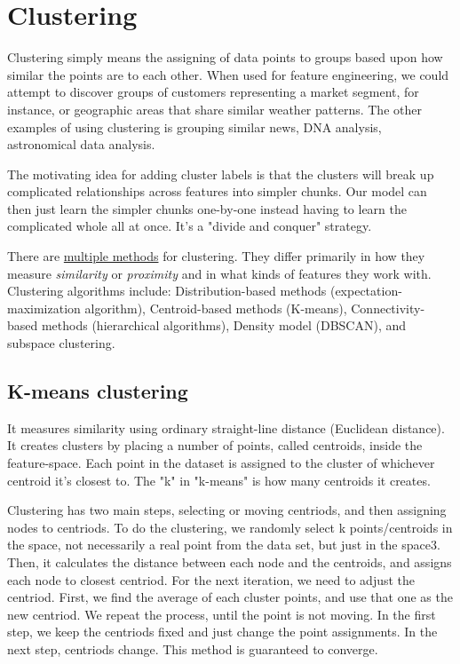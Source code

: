 \documentclass[12pt]{report}
\begin{document}
\section{Clustering}
Clustering simply means the assigning of data points to groups based upon how similar the points are to each other. When used for feature engineering, we could attempt to discover groups of customers representing a market segment, for instance, or geographic areas that share similar weather patterns. The other examples of using clustering is grouping similar news, DNA analysis, astronomical data analysis.


The motivating idea for adding cluster labels is that the clusters will break up complicated relationships across features into simpler chunks. Our model can then just learn the simpler chunks one-by-one instead having to learn the complicated whole all at once. It's a "divide and conquer" strategy.

There are \href{https://www.geeksforgeeks.org/different-types-clustering-algorithm/#}{multiple methods} for clustering. They differ primarily in how they measure \textit{similarity} or \textit{proximity} and in what kinds of features they work with. Clustering algorithms include: Distribution-based methods (expectation-maximization algorithm), Centroid-based methods (K-means), Connectivity-based methods (hierarchical algorithms), Density model (DBSCAN), and subspace clustering.

\subsection{K-means clustering}
It measures similarity using ordinary straight-line distance (Euclidean distance). It creates clusters by placing a number of points, called centroids, inside the feature-space. Each point in the dataset is assigned to the cluster of whichever centroid it's closest to. The "k" in "k-means" is how many centroids it creates.

Clustering has two main steps, selecting or moving centriods, and then assigning nodes to centriods. To do the clustering, we randomly select k points/centroids in the space, not necessarily a real point from the data set, but just in the space3. Then, it calculates the distance between each node and the centroids, and assigns each node to closest centriod. For the next iteration, we need to adjust the centriod. First, we find the average of each cluster points, and use that one as the new centriod. We repeat the process, until the point is not moving. In the first step, we keep the centriods fixed and just change the point assignments. In the next step, centriods change. This method is guaranteed to converge.
\end{document}
